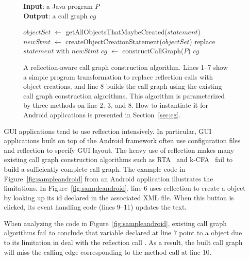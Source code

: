 \begin{figure}[t]
\textbf{Input}: a Java program $\mathit{P}$\\
\textbf{Output}: a call graph $\mathit{cg}$\\
\vspace{-5mm}
\begin{algorithmic}[1]
\STATE $\mathit{objectSet}$ $\leftarrow$ getAllObjectsThatMaybeCreated($\mathit{statement}$)
\STATE $\mathit{newStmt}$ $\leftarrow$ createObjectCreationStatement($\mathit{objectSet}$)
\STATE replace $\mathit{statement}$ with $\mathit{newStmt}$
\ENDIF
\ENDFOR
\STATE $\mathit{cg}$ $\leftarrow$ constructCallGraph($\mathit{P}$)
\RETURN $\mathit{cg}$
\vspace{-2mm}
\end{algorithmic}
\caption{A reflection-aware call graph construction algorithm. Lines
1--7 show a simple program transformation to replace reflection calls
with object creations, and line 8 builds the call graph using
the existing call graph construction algorithms. This algorithm
is parameterized by three methods on line 2, 3, and 8. How to
instantiate it for Android applications is presented in Section~\ref{sec:cg}.
} 
\label{fig:cgalgorithm}
\end{figure}

GUI applications tend to use reflection intensively. In particular, GUI applications built on 
top of the Android framework often use configuration files and reflection to specify GUI layout.
The heavy use of reflection makes many existing call graph construction algorithms such as RTA~\cite{rta}
and k-CFA~\cite{kcfa} fail to build a sufficiently complete call graph.
The example code in Figure~\ref{fig:sampleandroid} from an Android application
 illustrates the limitations.
In Figure~\ref{fig:sampleandroid}, line 6 uses reflection to create a 
object by looking up its id declared in the associated XML file. When this button
is clicked, its event handling code (lines 9--11) updates the text.

When analyzing the code in Figure~\ref{fig:sampleandroid}, existing call graph algorithms
fail to conclude that variable  declared at line 7
point to a  object due to its limitation in deal with the
reflection call . As a result, the built 
call graph will miss the calling edge corresponding to the method
call  at line 10. 

